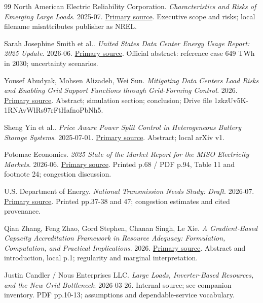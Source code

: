 \documentclass[11pt,letterpaper]{article}
\begin{document}
\begin{thebibliography}{99}
 North American Electric Reliability Corporation. \emph{Characteristics and Risks of Emerging Large Loads}. 2025-07. \href{https://www.nerc.com/globalassets/who-we-are/standing-committees/rstc/whitepaper-characteristics-and-risks-of-emerging-large-loads.pdf}{Primary source}. Executive scope and risks; local filename misattributes publisher as NREL.

 Sarah Josephine Smith et al.. \emph{United States Data Center Energy Usage Report: 2025 Update}. 2026-06. \href{https://bies.lbl.gov/publications/united-states-data-center-energy-2025}{Primary source}. Official abstract: reference case 649 TWh in 2030; uncertainty scenarios.

 Yousef Abudyak, Mohsen Alizadeh, Wei Sun. \emph{Mitigating Data Centers Load Risks and Enabling Grid Support Functions through Grid-Forming Control}. 2026. \href{https://arxiv.org/abs/2602.01013}{Primary source}. Abstract; simulation section; conclusion; Drive file 1zkzUv5K-1RNAvWlRs97rFtHafnoPbNh5.

 Sheng Yin et al.. \emph{Price Aware Power Split Control in Heterogeneous Battery Storage Systems}. 2025-07-01. \href{https://arxiv.org/abs/2507.00628}{Primary source}. Abstract; local arXiv v1.

 Potomac Economics. \emph{2025 State of the Market Report for the MISO Electricity Markets}. 2026-06. \href{https://www.potomaceconomics.com/wp-content/uploads/2026/07/2025-State-of-the-Market-Report.pdf}{Primary source}. Printed p.68 / PDF p.94, Table 11 and footnote 24; congestion discussion.

 U.S. Department of Energy. \emph{National Transmission Needs Study: Draft}. 2026-07. \href{https://www.energy.gov/documents/national-transmission-needs-study-draft-july-2026}{Primary source}. Printed pp.37-38 and 47; congestion estimates and cited provenance.

 Qian Zhang, Feng Zhao, Gord Stephen, Chanan Singh, Le Xie. \emph{A Gradient-Based Capacity Accreditation Framework in Resource Adequacy: Formulation, Computation, and Practical Implications}. 2026. \href{https://arxiv.org/abs/2601.22087}{Primary source}. Abstract and introduction, local p.1; regularity and marginal interpretation.

 Justin Candler / Nous Enterprises LLC. \emph{Large Loads, Inverter-Based Resources, and the New Grid Bottleneck}. 2026-03-26. Internal source; see companion inventory. PDF pp.10-13; assumptions and dependable-service vocabulary.


\end{thebibliography}
\end{document}
